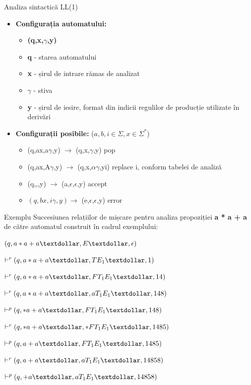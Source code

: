 \documentclass[pdf]{beamer}
\begin{document}
\begin{frame}{Analiza sintactică LL(1)}
\begin{itemize}
\item
\textbf{Configurația automatului:}

\begin{itemize}
\item
\textbf{(q,x,$\gamma$,y)}
\item
\textbf{q} - starea automatului
\item
\textbf{x} - șirul de intrare rămas de analizat
\item
\textbf{$\gamma$} - stiva
\item
\textbf{y} - șirul de iesire, format din indicii regulilor de producție utilizate în derivări
\end{itemize}

\item
\textbf{Configurații posibile:} ($a,b,i \in \Sigma,x \in \Sigma^*$)
\begin{itemize}
\item
(q,ax,a$\gamma$,y) $\rightarrow$ (q,x,$\gamma$,y) pop
\item
(q,ax,A$\gamma$,y) $\rightarrow$ (q,x,$\alpha\gamma$,yi) replace i, conform tabelei de analiză
\item
(q,\textdollar,\textdollar,y) $\rightarrow$ (a,$\epsilon$,$\epsilon$,y) accept
\item
$(q,bx,i\gamma,y) \rightarrow$ (e,$\epsilon$,$\epsilon$,y) error
\end{itemize}
\end{itemize}
\end{frame}



\begin{frame}{Exemplu}
Succesiunea relațiilor de mișcare pentru analiza propoziției \textbf{a * a + a} de către automatul construit în cadrul exemplului:

$(q,a*a+a\textdollar,E\textdollar,\epsilon)$

$\vdash^{r} (q,a*a+a\textdollar,TE_{1}\textdollar,1)$ 

$\vdash^{r} (q,a*a+a\textdollar,FT_{1}E_{1}\textdollar,14)$

$\vdash^{r} (q,a*a+a\textdollar,aT_{1}E_{1}\textdollar,148)$

$\vdash^{p} (q,*a+a\textdollar,FT_{1}E_{1}\textdollar,148)$ 

$\vdash^{r} (q,*a+a\textdollar,*FT_{1}E_{1}\textdollar,1485)$

$\vdash^{p} (q,a+a\textdollar,FT_{1}E_{1}\textdollar,1485)$

$\vdash^{r} (q,a+a\textdollar,aT_{1}E_{1}\textdollar,14858)$

$\vdash^{p} (q,+a\textdollar,aT_{1}E_{1}\textdollar,14858)$ 
\end{frame}
\end{document}
